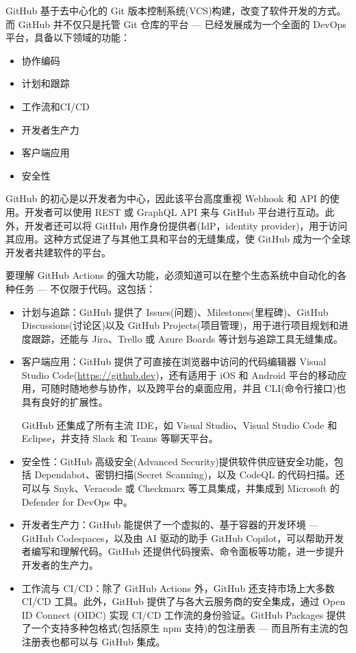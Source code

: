 GitHub 基于去中心化的 Git 版本控制系统(VCS)构建，改变了软件开发的方式。而 GitHub 并不仅只是托管 Git 仓库的平台 --- 已经发展成为一个全面的 DevOps 平台，具备以下领域的功能：

\begin{itemize}
\item 
协作编码

\item
计划和跟踪

\item
工作流和CI/CD 

\item
开发者生产力

\item
客户端应用

\item
安全性
\end{itemize}

GitHub 的初心是以开发者为中心，因此该平台高度重视 Webhook 和 API 的使用。开发者可以使用 REST 或 GraphQL API 来与 GitHub 平台进行互动。此外，开发者还可以将 GitHub 用作身份提供者(IdP，identity provider)，用于访问其应用。这种方式促进了与其他工具和平台的无缝集成，使 GitHub 成为一个全球开发者共建软件的平台。

要理解 GitHub Actions 的强大功能，必须知道可以在整个生态系统中自动化的各种任务 --- 不仅限于代码。这包括：

\begin{itemize}
\item
计划与追踪：GitHub 提供了 Issues(问题)、Milestones(里程碑)、GitHub Discussions(讨论区)以及 GitHub Projects(项目管理)，用于进行项目规划和进度跟踪，还能与 Jira、Trello 或 Azure Boards 等计划与追踪工具无缝集成。

\item
客户端应用：GitHub 提供了可直接在浏览器中访问的代码编辑器 Visual Studio Code(\url{https://github.dev})，还有适用于 iOS 和 Android 平台的移动应用，可随时随地参与协作，以及跨平台的桌面应用，并且 CLI(命令行接口)也具有良好的扩展性。

GitHub 还集成了所有主流 IDE，如 Visual Studio、Visual Studio Code 和 Eclipse，并支持 Slack 和 Teams 等聊天平台。

\item
安全性：GitHub 高级安全(Advanced Security)提供软件供应链安全功能，包括 Dependabot、密钥扫描(Secret Scanning)，以及 CodeQL 的代码扫描。还可以与 Snyk、Veracode 或 Checkmarx 等工具集成，并集成到 Microsoft 的 Defender for DevOps 中。

\item
开发者生产力：GitHub 能提供了一个虚拟的、基于容器的开发环境 --- GitHub Codespaces，以及由 AI 驱动的助手 GitHub Copilot，可以帮助开发者编写和理解代码。GitHub 还提供代码搜索、命令面板等功能，进一步提升开发者的生产力。

\item
工作流与 CI/CD：除了 GitHub Actions 外，GitHub 还支持市场上大多数 CI/CD 工具。此外，GitHub 提供了与各大云服务商的安全集成，通过 Open ID Connect (OIDC) 实现 CI/CD 工作流的身份验证。GitHub Packages 提供了一个支持多种包格式(包括原生 npm 支持)的包注册表 --- 而且所有主流的包注册表也都可以与 GitHub 集成。
\end{itemize}


